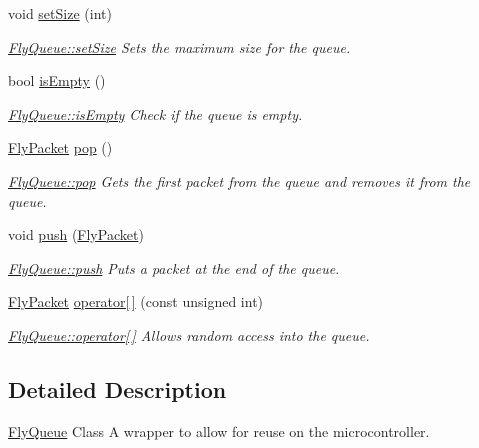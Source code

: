 \begin{DoxyCompactItemize}
void \hyperlink{class_fly_queue_a5ab4935882579e59c763319b0716ffa1}{set\+Size} (int)
\begin{DoxyCompactList}\small\item\em \hyperlink{class_fly_queue_a5ab4935882579e59c763319b0716ffa1}{Fly\+Queue\+::set\+Size} Sets the maximum size for the queue. \end{DoxyCompactList}\item 
bool \hyperlink{class_fly_queue_ac866e43ea0e8e6aab10d4e2ca5f733f3}{is\+Empty} ()
\begin{DoxyCompactList}\small\item\em \hyperlink{class_fly_queue_ac866e43ea0e8e6aab10d4e2ca5f733f3}{Fly\+Queue\+::is\+Empty} Check if the queue is empty. \end{DoxyCompactList}\item 
\hyperlink{class_fly_packet}{Fly\+Packet} \hyperlink{class_fly_queue_a96b802276ccd6ce04c42da2765001603}{pop} ()
\begin{DoxyCompactList}\small\item\em \hyperlink{class_fly_queue_a96b802276ccd6ce04c42da2765001603}{Fly\+Queue\+::pop} Gets the first packet from the queue and removes it from the queue. \end{DoxyCompactList}\item 
void \hyperlink{class_fly_queue_a93c9830f311b6f97d5e26fd882ef7d04}{push} (\hyperlink{class_fly_packet}{Fly\+Packet})
\begin{DoxyCompactList}\small\item\em \hyperlink{class_fly_queue_a93c9830f311b6f97d5e26fd882ef7d04}{Fly\+Queue\+::push} Puts a packet at the end of the queue. \end{DoxyCompactList}\item 
\hyperlink{class_fly_packet}{Fly\+Packet} \hyperlink{class_fly_queue_a00f38b409354127748f2093d38dee7be}{operator\mbox{[}$\,$\mbox{]}} (const unsigned int)
\begin{DoxyCompactList}\small\item\em \hyperlink{class_fly_queue_a00f38b409354127748f2093d38dee7be}{Fly\+Queue\+::operator\mbox{[}$\,$\mbox{]}} Allows random access into the queue. \end{DoxyCompactList}\end{DoxyCompactItemize}


\subsection{Detailed Description}
\hyperlink{class_fly_queue}{Fly\+Queue} Class A wrapper to allow for reuse on the microcontroller. 

